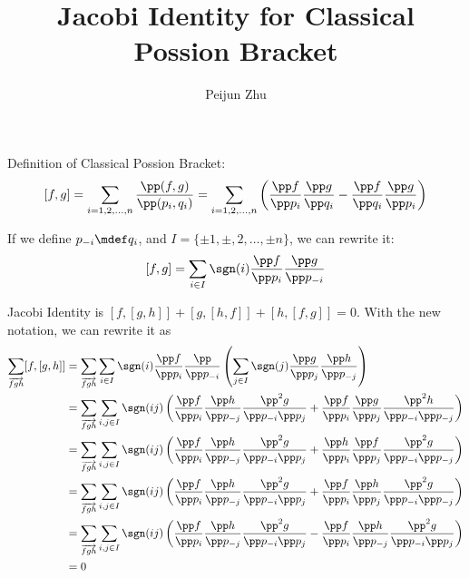 \documentclass[12pt]{article}
\newcommand{\poi}[1]{\pp p_{#1}}
\begin{document}
\title{Jacobi Identity for Classical Possion Bracket}
\author{Peijun Zhu}
\maketitle

Definition of Classical Possion Bracket:
\[ [f, g]=\sum_{i=1, 2,\ldots, n}\frac{\pp(f, g)}{\pp(p_i, q_i)}=\sum_{i=1, 2,\ldots, n}\left(\frac{\pp f}{\pp p_i}\frac{\pp g}{\pp q_i}-\frac{\pp f}{\pp q_i}\frac{\pp g}{\pp p_i}\right)\]

If we define $p_{-i}\mdef q_{i}$, and $I=\{\pm 1, \pm, 2,\ldots, \pm n\}$, we can rewrite it:
\[ [f, g]=\sum_{i\in I} \sgn(i) \frac{\pp f}{\pp p_i}\frac{\pp g}{\pp p_{-i}}\]

Jacobi Identity is $[f,[g,h]]+[g,[h,f]]+[h,[f,g]]=0$. With the new notation, we can rewrite it as
\begin{align}
\sum_{\overrightarrow{fgh}}[f,[g,h]]
  &=\sum_{\overrightarrow{fgh}}\sum_{i\in I}\sgn(i)\frac{\pp f}{\pp p_i}\frac{\pp}{\pp p_{-i}}\left(\sum_{j\in I}\sgn(j)\frac{\pp g}{\pp p_j}\frac{\pp h}{\pp p_{-j}}\right)\\
 &=\sum_{\overrightarrow{fgh}}\sum_{i, j\in I}\sgn(ij)\left(\frac{\pp f}{\poi{i}}\frac{\pp h}{\poi{-j}}\frac{\pp^2g}{\poi{-i}\poi{j}}
 +\frac{\pp f}{\poi{i}}\frac{\pp g}{\poi{j}}\frac{\pp^2h}{\poi{-i}\poi{-j}}\right)\\
 &=\sum_{\overrightarrow{fgh}}\sum_{i, j\in I}\sgn(ij)\left(\frac{\pp f}{\poi{i}}\frac{\pp h}{\poi{-j}}\frac{\pp^2g}{\poi{-i}\poi{j}}
 +\frac{\pp h}{\poi{i}}\frac{\pp f}{\poi{j}}\frac{\pp^2g}{\poi{-i}\poi{-j}}\right)\\
 &=\sum_{\overrightarrow{fgh}}\sum_{i, j\in I}\sgn(ij)\left(\frac{\pp f}{\poi{i}}\frac{\pp h}{\poi{-j}}\frac{\pp^2g}{\poi{-i}\poi{j}}
 +\frac{\pp f}{\poi{i}}\frac{\pp h}{\poi{j}}\frac{\pp^2g}{\poi{-i}\poi{-j}}\right)\\
 &=\sum_{\overrightarrow{fgh}}\sum_{i, j\in I}\sgn(ij)\left(\frac{\pp f}{\poi{i}}\frac{\pp h}{\poi{-j}}\frac{\pp^2g}{\poi{-i}\poi{j}}
 -\frac{\pp f}{\poi{i}}\frac{\pp h}{\poi{-j}}\frac{\pp^2g}{\poi{-i}\poi{j}}\right)\\
 &=0
\end{align}
\end{document}
